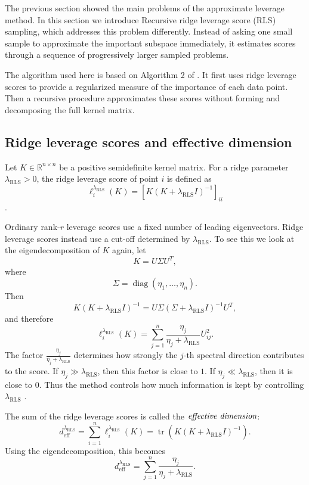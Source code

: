 The previous section showed the main problems of the approximate leverage method. In this section we introduce Recursive ridge leverage score (RLS) sampling, which addresses this problem differently. Instead of asking one small sample to approximate the important subspace immediately, it estimates scores through a sequence of progressively larger sampled problems.

The algorithm used here is based on Algorithm 2 of \citet{musco2017recursive}. It first uses ridge leverage scores to provide a regularized measure of the importance of each data point. Then a recursive procedure approximates these scores without forming and decomposing the full kernel matrix.

\subsection{Ridge leverage scores and effective dimension}

Let $K\in\mathbb{R}^{n\times n}$ be a positive semidefinite kernel matrix. For a ridge parameter $\lambda_{\mathrm{RLS}}>0$, the ridge leverage score of point $i$ is defined as
\[
\ell_i^{\lambda_{\mathrm{RLS}}}(K) = [ K(K+\lambda_{\mathrm{RLS}}I)^{-1} ]_{ii}
\] \citep{alaoui2015fast}.

Ordinary rank-$r$ leverage scores use a fixed number of leading eigenvectors. Ridge leverage scores instead use a cut-off determined by $\lambda_{\mathrm{RLS}}$. To see this we look at the eigendecomposition of $K$ again, let
\[
K=U\Sigma U^T,
\]
where
\[
\Sigma=\operatorname{diag}(\eta_1,\ldots,\eta_n).
\]
Then
\[
K(K+\lambda_{\mathrm{RLS}}I)^{-1} = U\Sigma (\Sigma+\lambda_{\mathrm{RLS}}I)^{-1} U^T,
\]
and therefore
\[
\ell_i^{\lambda_{\mathrm{RLS}}}(K) = \sum_{j=1}^n \frac{\eta_j}{\eta_j+\lambda_{\mathrm{RLS}}} U_{ij}^2.
\]
The factor $\frac{\eta_j}{\eta_j+\lambda_{\mathrm{RLS}}}$ determines how strongly the $j$-th spectral direction contributes to the score. If $\eta_j\gg\lambda_{\mathrm{RLS}}$, then this factor is close to $1$. If $\eta_j\ll\lambda_{\mathrm{RLS}}$, then it is close to $0$. Thus the method controls how much information is kept by controlling $\lambda_{\mathrm{RLS}}$ \citep{alaoui2015fast,musco2017recursive}.

The sum of the ridge leverage scores is called the $\emph{effective dimension}$:
\[
d_{\mathrm{eff}}^{\lambda_{\mathrm{RLS}}} = \sum_{i=1}^n \ell_i^{\lambda_{\mathrm{RLS}}}(K) = \operatorname{tr} ( K(K+\lambda_{\mathrm{RLS}}I)^{-1} ).
\]
Using the eigendecomposition, this becomes
\[
d_{\mathrm{eff}}^{\lambda_{\mathrm{RLS}}} = \sum_{j=1}^n \frac{\eta_j}{\eta_j+\lambda_{\mathrm{RLS}}}.
\]

